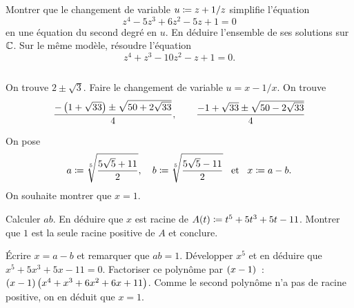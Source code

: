 \documentclass{magnolia}
\begin{document}

\begin{questions}
\question Montrer que le changement de variable $u\coloneqq z+1/z$ simplifie l'équation
  \[z^4-5z^3+6z^2-5z+1=0\]
  en une équation du second degré en $u$.
\question En déduire l'ensemble de ses solutions sur $\mathbb{C}$.
\question Sur le même modèle, résoudre l'équation
  \[z^4+z^3-10z^2-z+1=0.\]
\end{questions}
\begin{sol}
$\quad$
\begin{questions}
\question On trouve $2\pm\sqrt{3}$.
\question Faire le changement de variable $u=x-1/x$. On trouve
  \[\frac{-\left(1+\sqrt{33}\right)\pm\sqrt{50+2\sqrt{33}}}{4}, \qquad
    \frac{-1+\sqrt{33}\pm\sqrt{50-2\sqrt{33}}}{4}\]
\end{questions}
\end{sol}

On pose
\[a\coloneqq \sqrt[5]{\frac{5\sqrt{5}+11}{2}}, \quad b\coloneqq \sqrt[5]{\frac{5\sqrt{5}-11}{2}} \quad\!\text{et}\quad\!
  x\coloneqq a-b.\]
On souhaite montrer que $x=1$.
\begin{questions}
\question Calculer $ab$.
\question En déduire que $x$ est racine de $A(t)\coloneqq t^5+5t^3+5t-11$.
\question Montrer que $1$ est la seule racine positive de $A$ et conclure.
\end{questions}
\begin{sol}
Écrire $x=a-b$ et remarquer que $ab=1$. Développer $x^5$ et en déduire que
$x^5+5x^3+5x-11=0$. Factoriser ce polynôme par $\left(x-1\right)$~:
$\left(x-1\right)\left(x^4+x^3+6x^2+6x+11\right)$. Comme le second polynôme n'a pas de racine
positive, on en déduit que $x=1$.
\end{sol}

\end{document}
